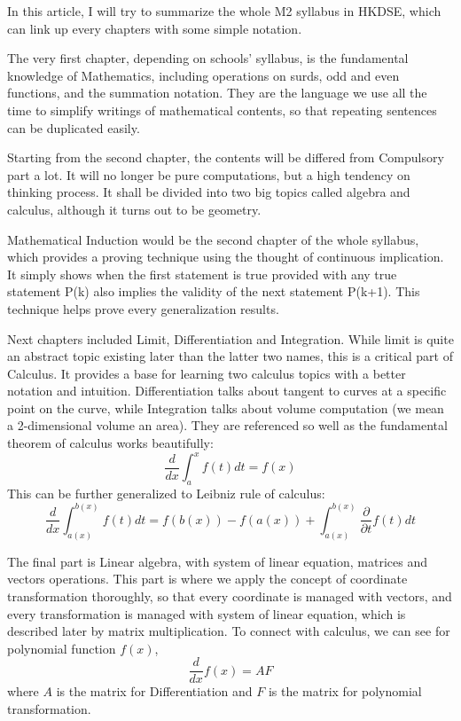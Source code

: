 \documentclass[12pt]{article}
\begin{document}
    In this article, I will try to summarize the whole M2 syllabus in HKDSE, which can link up every chapters with some simple notation.

    The very first chapter, depending on schools' syllabus, is the fundamental knowledge of Mathematics, including operations on surds, odd and even functions, and the summation notation. They are the language we use all the time to simplify writings of mathematical contents, so that repeating sentences can be duplicated easily.

    Starting from the second chapter, the contents will be differed from Compulsory part a lot. It will no longer be pure computations, but a high tendency on thinking process. It shall be divided into two big topics called algebra and calculus, although it turns out to be geometry.

    Mathematical Induction would be the second chapter of the whole syllabus, which provides a proving technique using the thought of continuous implication. It simply shows when the first statement is true provided with any true statement P(k) also implies the validity of the next statement P(k+1). This technique helps prove every generalization results.

    Next chapters included Limit, Differentiation and Integration. While limit is quite an abstract topic existing later than the latter two names, this is a critical part of Calculus. It provides a base for learning two calculus topics with a better notation and intuition. Differentiation talks about tangent to curves at a specific point on the curve, while Integration talks about volume computation (we mean a 2-dimensional volume an area). They are referenced so well as the fundamental theorem of calculus works beautifully: $$\frac{d}{dx}\int_a^x f(t)dt = f(x)$$ This can be further generalized to Leibniz rule of calculus: $$\frac{d}{dx}\int_{a(x)}^{b(x)}f(t)dt = f(b(x)) - f(a(x)) + \int_{a(x)}^{b(x)} \frac{\partial}{\partial t} f(t)dt$$

    The final part is Linear algebra, with system of linear equation, matrices and vectors operations. This part is where we apply the concept of coordinate transformation thoroughly, so that every coordinate is managed with vectors, and every transformation is managed with system of linear equation, which is described later by matrix multiplication. To connect with calculus, we can see for polynomial function $f(x)$, $$\dfrac{d}{dx}f(x)=AF$$ where $A$ is the matrix for Differentiation and $F$ is the matrix for polynomial transformation.
\end{document}
